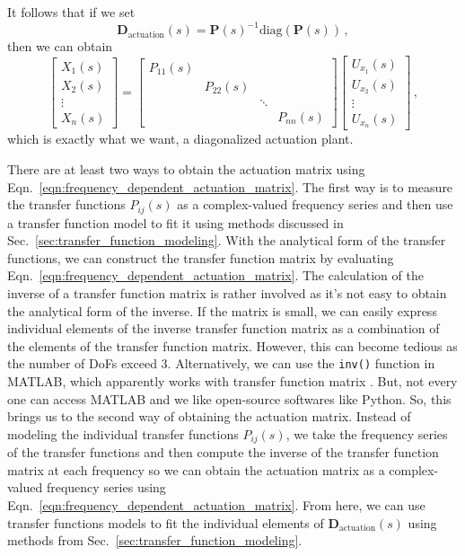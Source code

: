 It follows that if we set
\begin{equation}
	\mathbf{D}_\mathrm{actuation}(s) = \mathbf{P}(s)^{-1}\text{diag}\left(\mathbf{P}(s)\right)\,,
	\label{eqn:frequency_dependent_actuation_matrix}
\end{equation}
then we can obtain
\begin{equation}
	\begin{bmatrix}
		X_1(s)\\
		X_2(s)\\
		\vdots\\
		X_n(s)
	\end{bmatrix}
	=
	\begin{bmatrix}
		P_{11}(s) &  &  & \\
		& P_{22}(s) &  & \\
		&&\ddots&\\
		&&&P_{nn}(s)
	\end{bmatrix}
	\begin{bmatrix}
		U_{x_1}(s)\\
		U_{x_2}(s)\\
		\vdots\\
		U_{x_n}(s)
	\end{bmatrix}
	\,,
\end{equation}
which is exactly what we want, a diagonalized actuation plant.

There are at least two ways to obtain the actuation matrix using Eqn.~\eqref{eqn:frequency_dependent_actuation_matrix}.
The first way is to measure the transfer functions $P_{ij}(s)$ as a complex-valued frequency series and then use a transfer function model to fit it using methods discussed in Sec.~\ref{sec:transfer_function_modeling}.
With the analytical form of the transfer functions, we can construct the transfer function matrix by evaluating Eqn.~\eqref{eqn:frequency_dependent_actuation_matrix}.
The calculation of the inverse of a transfer function matrix is rather involved as it's not easy to obtain the analytical form of the inverse.
If the matrix is small, we can easily express individual elements of the inverse transfer function matrix as a combination of the elements of the transfer function matrix.
However, this can become tedious as the number of DoFs exceed 3.
Alternatively, we can use the \verb|inv()| function in MATLAB, which apparently works with transfer function matrix \cite{invert_models_matlab}.
But, not every one can access MATLAB and we like open-source softwares like Python.
So, this brings us to the second way of obtaining the actuation matrix.
Instead of modeling the individual transfer functions $P_{ij}(s)$, we take the frequency series of the transfer functions and then compute the inverse of the transfer function matrix at each frequency so we can obtain the actuation matrix as a complex-valued frequency series using Eqn.~\eqref{eqn:frequency_dependent_actuation_matrix}.
From here, we can use transfer functions models to fit the individual elements of $\mathbf{D}_\mathrm{actuation}(s)$ using methods from Sec.~\ref{sec:transfer_function_modeling}.

